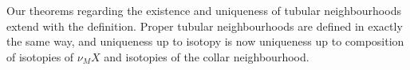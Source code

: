 Our theorems regarding the existence and uniqueness of tubular neighbourhoods extend with the definition.
Proper tubular neighbourhoods are defined in exactly the same way, and uniqueness up to isotopy is now uniqueness up to composition of isotopies of $\nu_M X$ and isotopies of the collar neighbourhood.